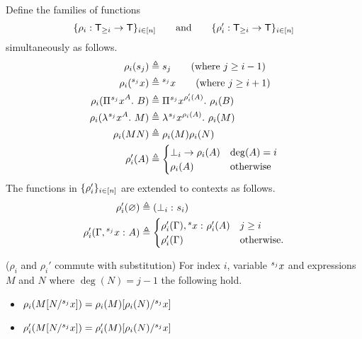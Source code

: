 \documentclass{article}
\begin{document}
\begin{definition}
Define the families of functions
\begin{displaymath}
  \{\rho_i : \mathsf{T}_{\geq i} \to \mathsf{T} \}_{i \in [n]}
  \qquad \text{and} \qquad
  \{\rho_i' : \mathsf{T}_{\geq i} \to \mathsf{T}\}_{i \in [n]}
\end{displaymath}
simultaneously as follows.
\begin{align*}
  \rho_i(s_j) &\triangleq s_j \qquad \text{(where $j \geq i - 1$)} \\
  \rho_i({}^{s_{j}}{x}) &\triangleq {}^{s_{j}}{x} \qquad \text{(where $j \geq i + 1$)} \\
  \rho_i({\Pi^{} {{}^{s_{j}}{x}}^{A}. \ {B}}) &\triangleq
    {\Pi^{} {{}^{s_{j}}{x}}^{\rho_i'(A)}. \ {\rho_i(B)}} \\
  \rho_i(\lambda^{} {}^{s_{j}}{x}^{A}. \ M) &\triangleq
    \lambda^{} {}^{s_{j}}{x}^{\rho_i(A)}. \ \rho_i(M) \\
  \rho_i(M N) &\triangleq \rho_i(M) \rho_i(N) \\
  \rho_i'(A) &\triangleq
  \begin{cases}
    \bot_i \to \rho_i(A) & \deg(A) = i \\
    \rho_i(A) & \textnormal{otherwise}
  \end{cases}
\end{align*}
The functions in $\{\rho_i'\}_{i \in [n]}$ are extended to contexts as follows.
\begin{align*}
\rho_i'(\varnothing) &\triangleq ({{\bot_i} :^{} {s_i}}) \\
\rho_i'(\Gamma, {{{}^{s_{j}}{x}} :^{} {A}}) &\triangleq
\begin{cases}
  \rho_i'(\Gamma), {{{}^{s}{x}} :^{} {\rho_i'(A)}} & j \geq i \\
  \rho_i'(\Gamma) & \textnormal{otherwise}. \\
\end{cases}
\end{align*}
\end{definition}

\begin{lemma}
\label{lem:rho-commutes-sub}
($\rho_i$ and $\rho_i'$ commute with substitution) For index $i$, variable ${}^{s_{j}}{x}$ and expressions $M$ and $N$ where $\deg(N) = j - 1$ the following hold.
\begin{itemize}
\item $\rho_i(M[N/{}^{s_{j}}{x}]) = \rho_i(M)[\rho_i(N)/{}^{s_{j}}{x}]$
\item $\rho_i'(M[N/{}^{s_{j}}{x}]) = \rho_i'(M)[\rho_i(N)/{}^{s_{j}}{x}]$
\end{itemize}
\end{lemma}
\end{document}
